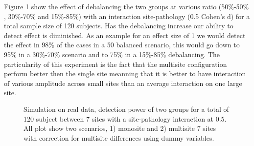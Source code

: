 \documentclass[authoryear]{elsarticle}
\begin{document}
Figure \ref{fig_real_sim_debalancing_interact} show the effect of debalancing the two groups at various ratio (50\%-50\% , 30\%-70\% and 15\%-85\%) with an interaction site-pathology (0.5 Cohen's d) for a total sample size of 120 subjects. Has the debalancing increase our ability to detect effect is diminished. As an example for an effect size of 1 we would detect the effect in 98\% of the cases in a 50 balanced scenario, this would go down to 95\% in a 30\%-70\% scenario and to 75\% in a 15\%-85\% debalancing. The particularity of this experiment is the fact that the multisite configuration perform better then the single site meanning that it is better to have interaction of various amplitude across small sites than an average interaction on one large site.


\begin{figure}[tbp]
\centering
\captionsetup[subfloat]{labelformat=empty}
\hspace{1mm}
\hspace{1mm}
\hspace{1mm}
\caption{
Simulation on real data, detection power of two groups for a total of 120 subject between 7 sites with a site-pathology interaction at 0.5. All plot show two scenarios, 1) monosite and 2) multisite 7 sites with correction for multisite differences using dummy variables.
}
\label{fig_real_sim_debalancing_interact}
\end{figure}
\end{document}
